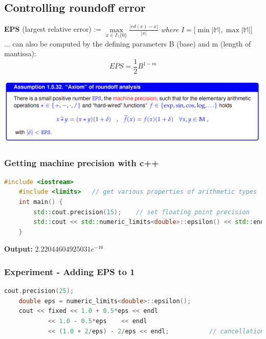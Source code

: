 \documentclass[12pt, a4paper]{article}
\newcommand{\M}{\mathbb{M}}
\begin{document}
\subsection{Controlling roundoff error}	
\textbf{EPS} (largest relative error) := $\max\limits_{x \in I\setminus \lbrace 0 \rbrace} \frac{|rd(x) - x|}{|x|}$ \quad \textit{where $I = \lbrack \min |\M|, \max |\M| \rbrack$}
\\

... can also be computed by the defining parameters B (base) and m (length of mantissa): \\
\begin{equation*}
		EPS = \frac{1}{2} B^{1-m}
\end{equation*}
		
\begin{center}
	\includegraphics[width=1.0\textwidth]{axiom_roundoff_analysis.png}
\end{center}
	
\subsubsection{Getting machine precision with c++}
\begin{lstlisting}[language=C++]
	#include <iostream>
	#include <limits> 	// get various properties of arithmetic types
	int main() {
		std::cout.precision(15); 	// set floating point precision
		std::cout << std::numeric_limits<double>::epsilon() << std::endl;
	}
\end{lstlisting}

\textbf{Output:} \quad $2.22044604925031e^{-16}$ \\
\pagebreak

\subsubsection{Experiment - Adding EPS to 1}
\begin{lstlisting}[language=C++]
	cout.precision(25);
	double eps = numeric_limits<double>::epsilon();
	cout << fixed << 1.0 + 0.5*eps << endl
			<< 1.0 - 0.5*eps	<< endl
			<< (1.0 + 2/eps) - 2/eps << endl;			// cancellation here
\end{lstlisting}
\end{document}
